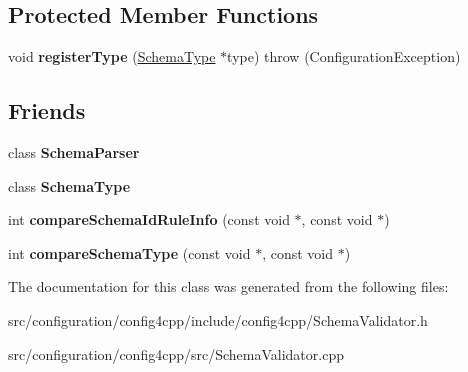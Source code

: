 \subsection*{Protected Member Functions}
\begin{DoxyCompactItemize}
\item 
\hypertarget{classCONFIG4CPP__NAMESPACE_1_1SchemaValidator_a0f9a5ec0f1bccf1d6a7ad6683ac79b21}{void {\bfseries register\-Type} (\hyperlink{classCONFIG4CPP__NAMESPACE_1_1SchemaType}{Schema\-Type} $\ast$type)  throw (\-Configuration\-Exception)}\label{classCONFIG4CPP__NAMESPACE_1_1SchemaValidator_a0f9a5ec0f1bccf1d6a7ad6683ac79b21}

\end{DoxyCompactItemize}
\subsection*{Friends}
\begin{DoxyCompactItemize}
\item 
\hypertarget{classCONFIG4CPP__NAMESPACE_1_1SchemaValidator_aacf417b319ed18d9192f294e9267b3b7}{class {\bfseries Schema\-Parser}}\label{classCONFIG4CPP__NAMESPACE_1_1SchemaValidator_aacf417b319ed18d9192f294e9267b3b7}

\item 
\hypertarget{classCONFIG4CPP__NAMESPACE_1_1SchemaValidator_ab2fb09983e4076374aabf2bdf92643ab}{class {\bfseries Schema\-Type}}\label{classCONFIG4CPP__NAMESPACE_1_1SchemaValidator_ab2fb09983e4076374aabf2bdf92643ab}

\item 
\hypertarget{classCONFIG4CPP__NAMESPACE_1_1SchemaValidator_ab71ce25ac9889257c422db208ec91754}{int {\bfseries compare\-Schema\-Id\-Rule\-Info} (const void $\ast$, const void $\ast$)}\label{classCONFIG4CPP__NAMESPACE_1_1SchemaValidator_ab71ce25ac9889257c422db208ec91754}

\item 
\hypertarget{classCONFIG4CPP__NAMESPACE_1_1SchemaValidator_a94d8ea775a97af3b1429081ba297f37d}{int {\bfseries compare\-Schema\-Type} (const void $\ast$, const void $\ast$)}\label{classCONFIG4CPP__NAMESPACE_1_1SchemaValidator_a94d8ea775a97af3b1429081ba297f37d}

\end{DoxyCompactItemize}


The documentation for this class was generated from the following files\-:\begin{DoxyCompactItemize}
\item 
src/configuration/config4cpp/include/config4cpp/Schema\-Validator.\-h\item 
src/configuration/config4cpp/src/Schema\-Validator.\-cpp\end{DoxyCompactItemize}
